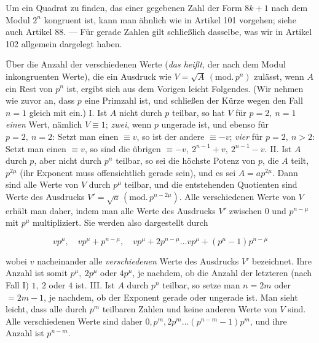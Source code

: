 Um ein Quadrat zu finden, das einer gegebenen Zahl der Form $8k+1$ nach dem Modul $2^n$ kongruent ist, kann man ähnlich wie in Artikel 101 vorgehen; siehe auch Artikel 88. --- Für gerade Zahlen gilt schließlich dasselbe, was wir in Artikel 102 allgemein dargelegt haben.

Über die Anzahl der verschiedenen Werte (\emph{das heißt,} der nach dem Modul inkongruenten Werte), die ein Ausdruck wie $V=\surd A\,(\mathrm{mod.}\,p^n)$ zulässt, wenn $A$ ein Rest von $p^n$ ist, ergibt sich aus dem Vorigen leicht Folgendes. (Wir nehmen wie zuvor an, dass $p$ eine Primzahl ist, und schließen der Kürze wegen den Fall $n=1$ gleich mit ein.) I. Ist $A$ nicht durch $p$ teilbar, so hat $V$ für $p=2,\ n=1$ \emph{einen} Wert, nämlich $V \equiv1$; \emph{zwei}, wenn $p$ ungerade ist, und ebenso für $p=2,\ n=2$: Setzt man einen $\equiv v$, so ist der andere $\equiv-v$; \emph{vier} für $p=2,\ n>2$: Setzt man einen $\equiv v$, so sind die übrigen $\equiv-v,\ 2^{n-1}+v,\ 2^{n-1}-v$. II. Ist $A$ durch $p$, aber nicht durch $p^n$ teilbar, so sei die höchste Potenz von $p$, die $A$ teilt, $p^{2\mu}$ (ihr Exponent muss offensichtlich gerade sein), und es sei $A=ap^{2\mu}$. Dann sind alle Werte von $V$ durch $p^\mu$ teilbar, und die entstehenden Quotienten sind Werte des Ausdrucks $V'=\surd a\,(\mathrm{mod.}\,p^{n-2\mu})$. Alle verschiedenen Werte von $V$ erhält man daher, indem man alle Werte des Ausdrucks $V'$ zwischen $0$ und $p^{n-\mu}$ mit $p^\mu$ multipliziert. Sie werden also dargestellt durch

\[
vp^\mu,\quad
vp^\mu+p^{n-\mu},\quad
vp^\mu+2p^{n-\mu}\ldots vp^\mu+(p^\mu-1)p^{n-\mu}
\]

wobei $v$ nacheinander alle \emph{verschiedenen} Werte des Ausdrucks $V'$ bezeichnet. Ihre Anzahl ist somit $p^\mu,\ 2p^\mu$ oder $4p^\mu$, je nachdem, ob die Anzahl der letzteren (nach Fall I) $1,\ 2$ oder $4$ ist. III. Ist $A$ durch $p^n$ teilbar, so setze man $n=2m$ oder $=2m-1$, je nachdem, ob der Exponent gerade oder ungerade ist. Man sieht leicht, dass alle durch $p^m$ teilbaren Zahlen und keine anderen Werte von $V$ sind. Alle verschiedenen Werte sind daher $0,p^m,2p^m\ldots(p^{n-m}-1)p^m$, und ihre Anzahl ist $p^{n-m}$.

